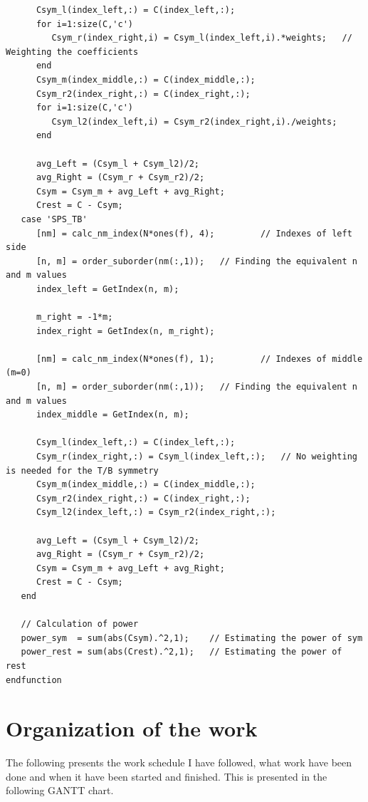 \documentclass{report}
\begin{document}
\begin{appendices}
\begin{lstlisting}
      Csym_l(index_left,:) = C(index_left,:);      
      for i=1:size(C,'c')
         Csym_r(index_right,i) = Csym_l(index_left,i).*weights;   // Weighting the coefficients
      end
      Csym_m(index_middle,:) = C(index_middle,:);      
      Csym_r2(index_right,:) = C(index_right,:);
      for i=1:size(C,'c')
         Csym_l2(index_left,i) = Csym_r2(index_right,i)./weights;
      end 
      
      avg_Left = (Csym_l + Csym_l2)/2;
      avg_Right = (Csym_r + Csym_r2)/2;
      Csym = Csym_m + avg_Left + avg_Right;
      Crest = C - Csym;
   case 'SPS_TB'
      [nm] = calc_nm_index(N*ones(f), 4);         // Indexes of left side
      [n, m] = order_suborder(nm(:,1));   // Finding the equivalent n and m values
      index_left = GetIndex(n, m);
      
      m_right = -1*m;
      index_right = GetIndex(n, m_right);
      
      [nm] = calc_nm_index(N*ones(f), 1);         // Indexes of middle (m=0)
      [n, m] = order_suborder(nm(:,1));   // Finding the equivalent n and m values
      index_middle = GetIndex(n, m);
      
      Csym_l(index_left,:) = C(index_left,:);
      Csym_r(index_right,:) = Csym_l(index_left,:);   // No weighting is needed for the T/B symmetry
      Csym_m(index_middle,:) = C(index_middle,:);      
      Csym_r2(index_right,:) = C(index_right,:);
      Csym_l2(index_left,:) = Csym_r2(index_right,:);
      
      avg_Left = (Csym_l + Csym_l2)/2;
      avg_Right = (Csym_r + Csym_r2)/2;      
      Csym = Csym_m + avg_Left + avg_Right;
      Crest = C - Csym;
   end
   
   // Calculation of power
   power_sym  = sum(abs(Csym).^2,1);    // Estimating the power of sym
   power_rest = sum(abs(Crest).^2,1);   // Estimating the power of rest
endfunction
\end{lstlisting}


\chapter{Organization of the work}


The following presents the work schedule I have followed, what work have been done and when it have been started and finished. This is presented in the following GANTT chart.


\end{appendices}
\end{document}
